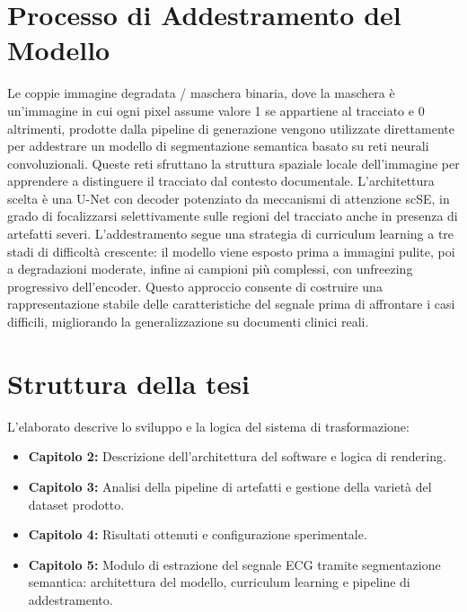 \section{Processo di Addestramento del Modello}
Le coppie immagine degradata / maschera binaria, dove la maschera è un'immagine in cui ogni pixel assume valore 1 se appartiene al tracciato e 0 altrimenti, prodotte dalla pipeline di generazione vengono utilizzate direttamente per addestrare un modello di segmentazione semantica basato su reti neurali convoluzionali. Queste reti sfruttano la struttura spaziale locale dell'immagine per apprendere a distinguere il tracciato dal contesto documentale. L'architettura scelta è una U-Net con decoder potenziato da meccanismi di attenzione scSE, in grado di focalizzarsi selettivamente sulle regioni del tracciato anche in presenza di artefatti severi. L'addestramento segue una strategia di curriculum learning a tre stadi di difficoltà crescente: il modello viene esposto prima a immagini pulite, poi a degradazioni moderate, infine ai campioni più complessi, con unfreezing progressivo dell'encoder. Questo approccio consente di costruire una rappresentazione stabile delle caratteristiche del segnale prima di affrontare i casi difficili, migliorando la generalizzazione su documenti clinici reali.

\section{Struttura della tesi}
L'elaborato descrive lo sviluppo e la logica del sistema di trasformazione:
\begin{itemize}
    \item \textbf{Capitolo 2:} Descrizione dell'architettura del software e logica di rendering.
    \item \textbf{Capitolo 3:} Analisi della pipeline di artefatti e gestione della varietà del dataset prodotto.
    \item \textbf{Capitolo 4:} Risultati ottenuti e configurazione sperimentale.
    \item \textbf{Capitolo 5:} Modulo di estrazione del segnale ECG tramite segmentazione semantica: architettura del modello, curriculum learning e pipeline di addestramento.
\end{itemize}
